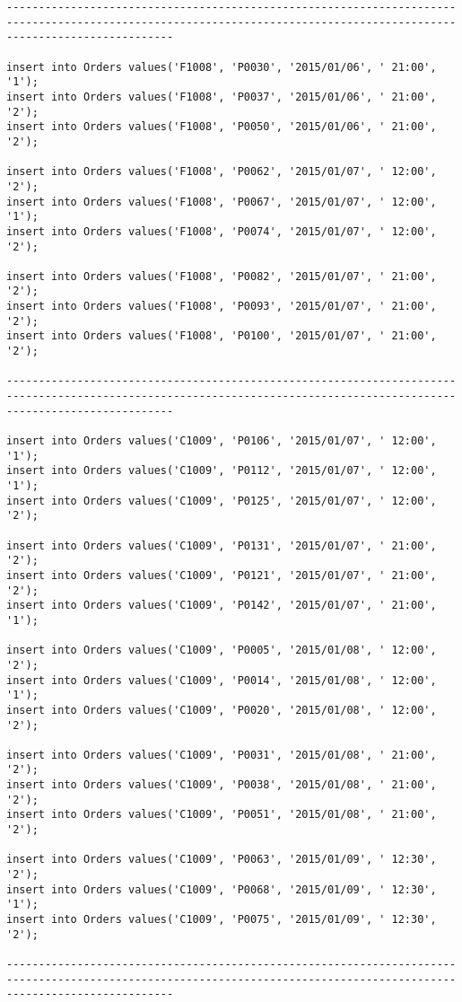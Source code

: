 \documentclass[a4,12pt]{report}
\begin{document}
\begin{lstlisting}
----------------------------------------------------------------------------------------------------------------------------------------------------------------------

insert into Orders values('F1008', 'P0030', '2015/01/06', ' 21:00', '1');
insert into Orders values('F1008', 'P0037', '2015/01/06', ' 21:00', '2');
insert into Orders values('F1008', 'P0050', '2015/01/06', ' 21:00', '2');

insert into Orders values('F1008', 'P0062', '2015/01/07', ' 12:00', '2');
insert into Orders values('F1008', 'P0067', '2015/01/07', ' 12:00', '1');
insert into Orders values('F1008', 'P0074', '2015/01/07', ' 12:00', '2');

insert into Orders values('F1008', 'P0082', '2015/01/07', ' 21:00', '2');
insert into Orders values('F1008', 'P0093', '2015/01/07', ' 21:00', '2');
insert into Orders values('F1008', 'P0100', '2015/01/07', ' 21:00', '2');

----------------------------------------------------------------------------------------------------------------------------------------------------------------------

insert into Orders values('C1009', 'P0106', '2015/01/07', ' 12:00', '1');
insert into Orders values('C1009', 'P0112', '2015/01/07', ' 12:00', '1');
insert into Orders values('C1009', 'P0125', '2015/01/07', ' 12:00', '2');

insert into Orders values('C1009', 'P0131', '2015/01/07', ' 21:00', '2');
insert into Orders values('C1009', 'P0121', '2015/01/07', ' 21:00', '2');
insert into Orders values('C1009', 'P0142', '2015/01/07', ' 21:00', '1');

insert into Orders values('C1009', 'P0005', '2015/01/08', ' 12:00', '2');
insert into Orders values('C1009', 'P0014', '2015/01/08', ' 12:00', '1');
insert into Orders values('C1009', 'P0020', '2015/01/08', ' 12:00', '2');

insert into Orders values('C1009', 'P0031', '2015/01/08', ' 21:00', '2');
insert into Orders values('C1009', 'P0038', '2015/01/08', ' 21:00', '2');
insert into Orders values('C1009', 'P0051', '2015/01/08', ' 21:00', '2');

insert into Orders values('C1009', 'P0063', '2015/01/09', ' 12:30', '2');
insert into Orders values('C1009', 'P0068', '2015/01/09', ' 12:30', '1');
insert into Orders values('C1009', 'P0075', '2015/01/09', ' 12:30', '2');

----------------------------------------------------------------------------------------------------------------------------------------------------------------------


\end{lstlisting}
\end{document}
